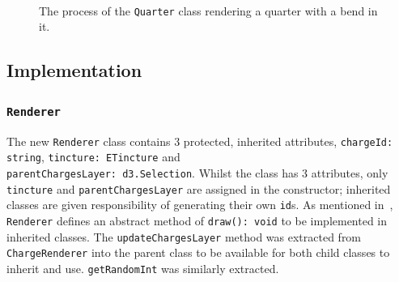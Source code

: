 \documentclass[nobib, a4paper, twoside, justified]{tufte-book}
\begin{document}
\begin{figure}
  \centering
  \qquad
  \\
  \qquad
  \\
  \qquad
  \\
  \caption{The process of the \texttt{Quarter} class rendering a quarter with a bend in it.}%
  \label{fig:quarter_rendering}
\end{figure}

\subsection{Implementation}%
\label{sub:third_design_implementation}


\subsubsection{\texttt{Renderer}}%
\label{ssub:renderer}

The new \texttt{Renderer} class contains 3 protected, inherited attributes, \texttt{chargeId:
string}, \texttt{tincture: ETincture} and \\ \texttt{parentChargesLayer: d3.Selection}. Whilst the
class has 3 attributes, only \texttt{tincture} and \texttt{parentChargesLayer} are assigned in the
constructor; inherited classes are given responsibility of generating their own \texttt{id}s. As
mentioned in~, \texttt{Renderer} defines an abstract method of
\texttt{draw(): void} to be implemented in inherited classes. The \texttt{updateChargesLayer}
method was extracted from \texttt{ChargeRenderer} into the parent class to be available for both
child classes to inherit and use. \texttt{getRandomInt} was similarly extracted.
\end{document}
